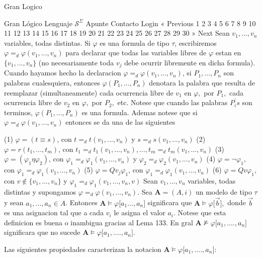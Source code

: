 Gran Logico

Gran Lógico
Lenguaje \(\mathcal{S}^{\Sigma }\)
Apunte
Contacto
Login
« Previous
1
2
3
4
5
6
7
8
9
10
11
12
13
14
15
16
17
18
19
20
21
22
23
24
25
26
27
28
29
30
» Next
Sean \(v_{1},...,v_{n}\) variables, todas distintas. Si \(\varphi \) es una formula de tipo \(\tau \), escribiremos \(\varphi =_{d}\varphi (v_{1},...,v_{n}) \) para declarar que todas las variables libres de \(\varphi \) estan en \(\{v_{1},...,v_{n}\}\) (no necesariamente toda \(v_{j}\) debe ocurrir libremente en dicha formula). Cuando hayamos hecho la declaracion \( \varphi =_{d}\varphi (v_{1},...,v_{n})\), si \(P_{1},...,P_{n}\) son palabras cualesquiera, entonces \(\varphi (P_{1},...,P_{n})\) denotara la palabra que resulta de reemplazar (simultaneamente) cada ocurrencia libre de \(v_{1}\) en \( \varphi ,\) por \(P_{1}, \) cada ocurrencia libre de \(v_{2}\) en \(\varphi ,\) por \(P_{2},\) etc. Notese que cuando las palabras \(P_{i}^{\prime }s\) son terminos, \(\varphi (P_{1},...,P_{n})\) es una formula. Ademas notese que si \( \varphi =_{d}\varphi (v_{1},...,v_{n})\) entonces se da una de las siguientes

(1) \(\varphi =(t\equiv s)\), con \(t=_{d}t(v_{1},...,v_{n})\) y \( s=_{d}s(v_{1},...,v_{n})\)
(2) \(\varphi =r(t_{1},...,t_{m})\), con \( t_{1}=_{d}t_{1}(v_{1},...,v_{n}),...,t_{m}=_{d}t_{m}(v_{1},...,v_{n})\)
(3) \(\varphi =(\varphi _{1}\eta \varphi _{2})\), con \(\varphi _{1}=_{d}\varphi _{1}(v_{1},...,v_{n})\) y \(\varphi _{2}=_{d}\varphi _{2}(v_{1},...,v_{n})\)
(4) \(\varphi =\lnot \varphi _{1}\), con \(\varphi _{1}=_{d}\varphi _{1}(v_{1},...,v_{n})\)
(5) \(\varphi =Qv_{j}\varphi _{1}\), con \(\varphi _{1}=_{d}\varphi _{1}(v_{1},...,v_{n})\)
(6) \(\varphi =Qv\varphi _{1}\), con \(v\not\in \{v_{1},...,v_{n}\}\) y \( \varphi _{1}=_{d}\varphi _{1}(v_{1},...,v_{n},v)\)
Sean \(v_{1},...,v_{n}\) variables, todas distintas y supongamos \(\varphi =_{d}\varphi (v_{1},...,v_{n})\). Sea \(\mathbf{A}=(A,i)\) un modelo de tipo \( \tau \) y sean \(a_{1},...,a_{n}\in A\). Entonces \(\mathbf{A}\models \varphi \lbrack a_{1}...,a_{n}]\) significara que \(\mathbf{A}\models \varphi \lbrack \vec{b}],\) donde \(\vec{b}\) es una asignacion tal que a cada \(v_{i}\) le asigna el valor \(a_{i}.\) Notese que esta definicion es buena o inambigua gracias al Lema 133. En gral \(\mathbf{A}\not\models \varphi \lbrack a_{1},....,a_{n}]\) significara que no sucede \(\mathbf{A}\models \varphi \lbrack a_{1},....,a_{n}].\)

Las siguientes propiedades caracterizan la notacion \(\mathbf{A}\models \varphi \lbrack a_{1},....,a_{n}]\):

